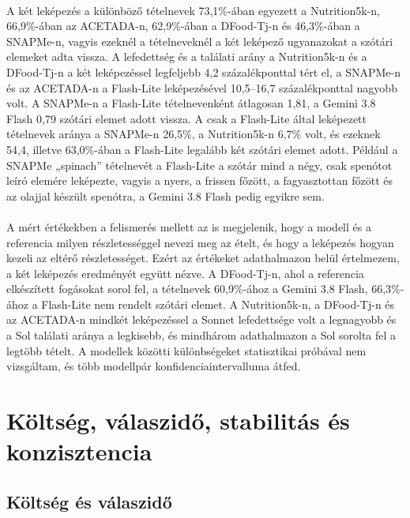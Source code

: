 \paragraph{}A két leképezés a különböző tételnevek 73,1\%-ában egyezett a Nutrition5k-n, 
66,9\%-ában az ACETADA-n, 62,9\%-ában a DFood-Tj-n és 46,3\%-ában a SNAPMe-n, vagyis ezeknél a 
tételneveknél a két leképező ugyanazokat a szótári elemeket adta vissza. A lefedettség és a találati arány 
a Nutrition5k-n és a DFood-Tj-n a két leképezéssel legfeljebb 4,2 százalékponttal tért el, a 
SNAPMe-n és az ACETADA-n a Flash-Lite leképezésével 10,5--16,7 százalékponttal nagyobb volt. A 
SNAPMe-n a Flash-Lite tételnevenként átlagosan 1,81, a Gemini 3.8 Flash 0,79 szótári elemet adott 
vissza. A csak a Flash-Lite által leképezett tételnevek aránya a SNAPMe-n 26,5\%, a 
Nutrition5k-n 6,7\% volt, és ezeknek 54,4, illetve 63,0\%-ában a Flash-Lite legalább két 
szótári elemet adott. Például a SNAPMe „spinach” tételnevét a Flash-Lite a szótár mind a négy, 
csak spenótot leíró elemére leképezte, vagyis a nyers, a frissen főzött, a fagyasztottan főzött 
és az olajjal készült spenótra, a Gemini 3.8 Flash pedig egyikre sem.

\paragraph{}A mért értékekben a felismerés mellett az is megjelenik, hogy a modell és a 
referencia milyen részletességgel nevezi meg az ételt, és hogy a leképezés hogyan kezeli az 
eltérő részletességet. Ezért az értékeket adathalmazon belül értelmezem, a két leképezés 
eredményét együtt nézve. A DFood-Tj-n, ahol a referencia elkészített fogásokat sorol fel, a tételnevek 
60,9\%-ához a Gemini 3.8 Flash, 66,3\%-ához a Flash-Lite nem rendelt szótári elemet. A Nutrition5k-n, a DFood-Tj-n és az 
ACETADA-n mindkét leképezéssel a Sonnet lefedettsége volt a legnagyobb és a Sol találati aránya a 
legkisebb, és mindhárom adathalmazon a Sol sorolta fel a legtöbb tételt. A modellek közötti különbségeket statisztikai próbával nem vizsgáltam, és több modellpár 
konfidenciaintervalluma átfed.

\section{Költség, válaszidő, stabilitás és konzisztencia}

\subsection{Költség és válaszidő}
